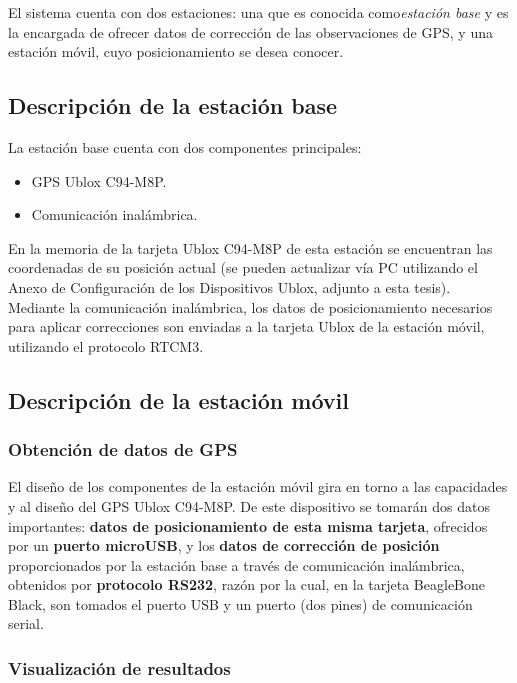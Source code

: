 El sistema cuenta con dos estaciones: una que es conocida como\textit{estación base} y es la encargada de ofrecer datos de corrección de las observaciones de GPS, y una estación móvil, cuyo posicionamiento se desea conocer. 

\subsection{Descripción de la estación base}

La estación base cuenta con dos componentes principales:

\begin{itemize}
\item GPS Ublox C94-M8P.
\item Comunicación inalámbrica.
\end{itemize}

En la memoria de la tarjeta Ublox C94-M8P de esta estación se encuentran las coordenadas de su posición actual (se pueden actualizar vía PC utilizando el Anexo de Configuración de los Dispositivos Ublox, adjunto a esta tesis).\\

Mediante la comunicación inalámbrica, los datos de posicionamiento necesarios para aplicar correcciones son enviadas a la tarjeta Ublox de la estación móvil, utilizando el protocolo RTCM3.

\subsection{Descripción de la estación móvil}

\subsubsection{Obtención de datos de GPS}

El diseño de los componentes de la estación móvil gira en torno a las capacidades y al diseño del GPS Ublox C94-M8P. De este dispositivo se tomarán dos datos importantes: \textbf{datos de posicionamiento de esta misma tarjeta}, ofrecidos por un \textbf{puerto microUSB}, y los \textbf{datos de corrección de posición} proporcionados por la estación base a través de comunicación inalámbrica, obtenidos por \textbf{protocolo RS232}, razón por la cual, en la tarjeta BeagleBone Black, son tomados el puerto USB y un puerto (dos pines) de comunicación serial.\\

\subsubsection{Visualización de resultados}

